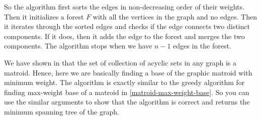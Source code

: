 So the algorithm first sorts the edges in non-decreasing order of their weights. Then it initializes a forest $F$ with all the vertices in the graph and no edges. Then it iterates through the sorted edges and checks if the edge connects two distinct components. If it does, then it adds the edge to the forest and merges the two components. The algorithm stops when we have $n-1$ edges in the forest.
\begin{algorithm}[htbp]
	\caption{\textsc{Kruskal's Algorithm}}
	\DontPrintSemicolon
\end{algorithm}
We have shown in  that the set of collection of acyclic sets in any graph is a matroid. Hence, here we are basically finding a base of the graphic matroid with minimum weight. The algorithm is exactly similar to the greedy algorithm for finding max-weight base of a matroid in \autoref{matroid-max-weight-base}. So you can use the similar arguments to show that the algorithm is correct and returns the minimum spanning tree of the graph.

